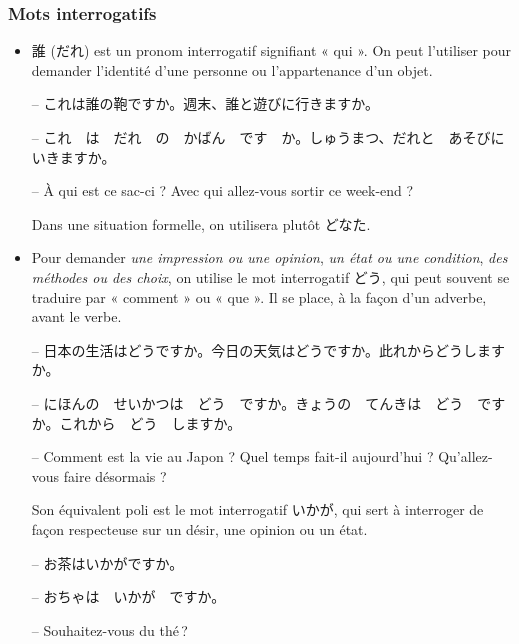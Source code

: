         \subsubsection{Mots interrogatifs}

    \begin{itemize}
        \item 誰 (だれ) est un pronom interrogatif signifiant « qui ». On peut l'utiliser pour demander l'identité d'une personne ou l'appartenance d'un objet.
        
        \begin{tcolorbox}
        -- これは誰の鞄ですか。週末、誰と遊びに行きますか。

        -- これ　は　だれ　の　かばん　です　か。しゅうまつ、だれと　あそびにいきますか。

        -- À qui est ce sac-ci ? Avec qui allez-vous sortir ce week-end ?
        \end{tcolorbox}

        Dans une situation formelle, on utilisera plutôt どなた.

        \item Pour demander \textit{une impression ou une opinion}, \textit{un état ou une condition}, \textit{des méthodes ou des choix}, on utilise le mot interrogatif どう, qui peut souvent se traduire par « comment » ou « que ». Il se place, à la façon d'un adverbe, avant le verbe.
        
        \begin{tcolorbox}
            -- 日本の生活はどうですか。今日の天気はどうですか。此れからどうしますか。

            -- にほんの　せいかつは　どう　ですか。きょうの　てんきは　どう　ですか。これから　どう　しますか。

            -- Comment est la vie au Japon ? Quel temps fait-il aujourd'hui ? Qu'allez-vous faire désormais ?
        \end{tcolorbox}

        Son équivalent poli est le mot interrogatif いかが, qui sert à interroger de façon respecteuse sur un désir, une opinion ou un état.

        \begin{tcolorbox}
            -- お茶はいかがですか。

            -- おちゃは　いかが　ですか。

            -- Souhaitez-vous du thé ?
        \end{tcolorbox}


\end{itemize}
